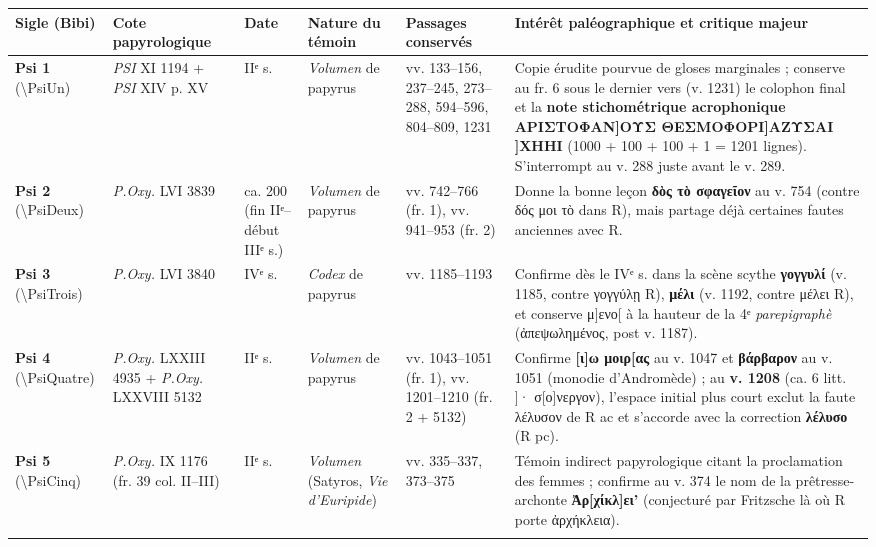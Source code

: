 \documentclass[11pt, a4paper, twoside]{article}
\renewcommand{\_}{\origunderscore\penalty0\relax}
\renewcommand{\texttt}[1]{#1}
\newcommand{\R}{\textbf{R}}
\newcommand{\Rac}{\textbf{R}\textsuperscript{ac}}
\newcommand{\Rpc}{\textbf{R}\textsuperscript{pc}}
\newcommand{\Bibi}{\textit{Bibi}}
\newcommand{\PsiUn}{\textgreek{Ψ}\textsuperscript{1}}
\newcommand{\PsiDeux}{\textgreek{Ψ}\textsuperscript{2}}
\newcommand{\PsiTrois}{\textgreek{Ψ}\textsuperscript{3}}
\newcommand{\PsiQuatre}{\textgreek{Ψ}\textsuperscript{4}}
\newcommand{\PsiCinq}{\textgreek{Ψ}\textsuperscript{5}}
\def\R{R}%
\def\Rac{R ac}%
\def\Rpc{R pc}%
\def\Bibi{Bibi}%
\def\PsiUn{Psi 1}%
\def\PsiDeux{Psi 2}%
\def\PsiTrois{Psi 3}%
\def\PsiQuatre{Psi 4}%
\def\PsiCinq{Psi 5}%
\begin{document}
{\small
\begin{longtable}{@{}>{\raggedright\arraybackslash}p{} >{\raggedright\arraybackslash}p{} >{\raggedright\arraybackslash}p{} >{\raggedright\arraybackslash}p{} >{\raggedright\arraybackslash}p{} >{\raggedright\arraybackslash}p{}@{}}
\toprule
\textbf{Sigle (\Bibi{})} & \textbf{Cote papyrologique} & \textbf{Date} & \textbf{Nature du témoin} & \textbf{Passages conservés} & \textbf{Intérêt paléographique et critique majeur} \\
\midrule
\endhead
\bottomrule
\endfoot
\textbf{\PsiUn{}} (\texttt{\textbackslash PsiUn}) & \textit{PSI} XI 1194 + \textit{PSI} XIV p. XV & IIᵉ s. & \textit{Volumen} de papyrus & \texttt{vv. 133–156, 237–245, 273–288, 594–596, 804–809, 1231} & Copie érudite pourvue de gloses marginales ; conserve au fr. 6 sous le dernier vers (\texttt{v. 1231}) le colophon final et la \textbf{note stichométrique acrophonique \texttt{ΑΡΙΣΤΟΦΑΝ]\allowbreak ΟΥΣ ΘΕΣΜΟΦΟΡΙ]\allowbreak ΑΖΥΣΑΙ ]ΧΗΗΙ}} (1000 + 100 + 100 + 1 = 1201 lignes). S'interrompt au v. 288 juste avant le v. 289. \\
\addlinespace[3pt]
\textbf{\PsiDeux{}} (\texttt{\textbackslash PsiDeux}) & \textit{P.Oxy.} LVI 3839 & ca. 200 (fin IIᵉ–début IIIᵉ s.) & \textit{Volumen} de papyrus & \texttt{vv. 742–766} (fr. 1), \texttt{vv. 941–953} (fr. 2) & Donne la bonne leçon \textbf{\texttt{δὸς τὸ σφαγεῖον}} au v. 754 (contre \texttt{δός μοι τὸ} dans \R{}), mais partage déjà certaines fautes anciennes avec \R{}. \\
\addlinespace[3pt]
\textbf{\PsiTrois{}} (\texttt{\textbackslash PsiTrois}) & \textit{P.Oxy.} LVI 3840 & IVᵉ s. & \textit{Codex} de papyrus & \texttt{vv. 1185–1193} & Confirme dès le IVᵉ s. dans la scène scythe \textbf{\texttt{γογγυλί}} (v. 1185, contre \texttt{γογγύλῃ} \R{}), \textbf{\texttt{μέλι}} (v. 1192, contre \texttt{μέλει} \R{}), et conserve \texttt{μ]ενο[} à la hauteur de la 4ᵉ \textit{parepigraphè} (\texttt{ἀπεψωλημένος}, post v. 1187). \\
\addlinespace[3pt]
\textbf{\PsiQuatre{}} (\texttt{\textbackslash PsiQuatre}) & \textit{P.Oxy.} LXXIII 4935 + \textit{P.Oxy.} LXXVIII 5132 & IIᵉ s. & \textit{Volumen} de papyrus & \texttt{vv. 1043–1051} (fr. 1), \texttt{vv. 1201–1210} (fr. 2 + 5132) & Confirme \textbf{\texttt{[ι]ω μοιρ[ας}} au v. 1047 et \textbf{\texttt{βάρβαρον}} au v. 1051 (monodie d'Andromède) ; au \textbf{v. 1208} (\texttt{ca. 6 litt. ]· σ[ο]νεργον}), l'espace initial plus court exclut la faute \texttt{λέλυσον} de \Rac{} et s'accorde avec la correction \textbf{\texttt{λέλυσο}} (\Rpc{}). \\
\addlinespace[3pt]
\textbf{\PsiCinq{}} (\texttt{\textbackslash PsiCinq}) & \textit{P.Oxy.} IX 1176 (fr. 39 col. II–III) & IIᵉ s. & \textit{Volumen} (Satyros, \textit{Vie d'Euripide}) & \texttt{vv. 335–337, 373–375} & Témoin indirect papyrologique citant la proclamation des femmes ; confirme au v. 374 le nom de la prêtresse-archonte \textbf{\texttt{Ἀρ[χίκλ]ει'}} (conjecturé par Fritzsche là où \R{} porte \texttt{ἀρχήκλεια}). \\
\addlinespace[3pt]
\end{longtable}
}
\end{document}
